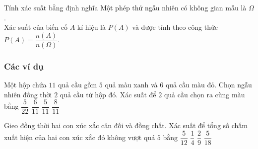 \begin{dang}{Tính xác suất bằng định nghĩa}
		Một phép thử ngẫu nhiên có không gian mẫu là $\Omega$.\\
	Xác suất của biến cố $A$ kí hiệu là $P(A)$ và được tính theo công thức $P(A)=\dfrac{n(A)}{n(\Omega)}$.
\end{dang}



\subsubsection{Các ví dụ}
\begin{vd}
	Một hộp chứa $11$ quả cầu gồm $5$ quả màu xanh và $6$ quả cầu màu đỏ. Chọn ngẫu nhiên đồng thời $2$ quả cầu từ hộp đó. Xác suất để $2$ quả cầu chọn ra cùng màu bằng
	\choice
	{$ \dfrac{5}{22} $}
	{$ \dfrac{6}{11} $}
	{\True$ \dfrac{5}{11} $}
	{$ \dfrac{8}{11} $}
\end{vd}
\begin{vd}
	Gieo đồng thời hai con xúc xắc cân đối và đồng chất. Xác suất để tổng số chấm xuất hiện của hai con xúc xắc đó không vượt quá $5$ bằng
	\choice
	{$ \dfrac{5}{12} $}
	{$ \dfrac{1}{4} $}
	{$ \dfrac{2}{9} $}
	{\True$ \dfrac{5}{18} $}
\end{vd}
